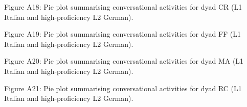 \begin{stylecaption}
Figure A18: Pie plot summarising conversational activities for dyad CR (L1 Italian and high-proficiency L2 German).
\end{stylecaption}

\begin{stylecaption}
  
 
\end{stylecaption}

\begin{stylecaption}
Figure A19: Pie plot summarising conversational activities for dyad FF (L1 Italian and high-proficiency L2 German).
\end{stylecaption}

\begin{stylecaption}
  
 
\end{stylecaption}

\begin{stylecaption}
Figure A20: Pie plot summarising conversational activities for dyad MA (L1 Italian and high-proficiency L2 German). 
\end{stylecaption}

\begin{stylecaption}
  
 
\end{stylecaption}

\begin{stylecaption}
Figure A21: Pie plot summarising conversational activities for dyad RC (L1 Italian and high-proficiency L2 German). 
\end{stylecaption}

\begin{stylecaption}
  
 
\end{stylecaption}


